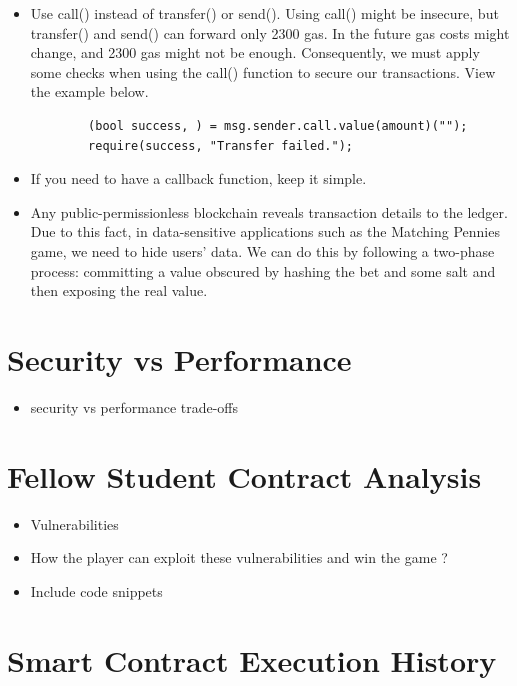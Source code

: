 \documentclass[12pt,a4paper]{article}
\begin{document}
\begin{itemize}
    \item Use call() instead of transfer() or send().
    Using call() might be insecure, but transfer() and send() can forward only 2300 gas. In the future 
    gas costs might change, and 2300 gas might not be enough. Consequently, we must apply some
    checks when using the call() function to secure our transactions. View the example below. \\
    \begin{lstlisting}
        (bool success, ) = msg.sender.call.value(amount)(""); 
        require(success, "Transfer failed.");
    \end{lstlisting}
    \item If you need to have a callback function, keep it simple.
    \item Any public-permissionless blockchain reveals transaction details to 
    the ledger. Due to this fact, in data-sensitive applications such as the
    Matching Pennies game, we need to hide users' data. We can do this by following a
    two-phase process: committing a value obscured by hashing the bet and some salt
    and then exposing the real value.
\end{itemize}

\section*{Security vs Performance}
\begin{itemize}
        \item security vs performance trade-offs
\end{itemize}

\section*{Fellow Student Contract Analysis}
\begin{itemize}
        \item Vulnerabilities
        \item How the player can exploit these vulnerabilities and win the game ?
        \item Include code snippets
\end{itemize}

\section*{Smart Contract Execution History}
\end{document}

